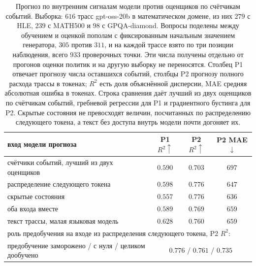 \documentclass[11pt]{article}
\begin{document}
\begin{table}[t]
\centering
\begin{tabular}{lccc}
\toprule
вход модели прогноза & P1 $R^2\uparrow$ & P2 $R^2\uparrow$ & P2 MAE$\downarrow$ \\
\midrule
счётчики событий, лучший из двух оценщиков & $0.590$ & $0.703$ & $697$ \\
распределение следующего токена & $0.598$ & $\mathbf{0.776}$ & $647$ \\
скрытые состояния               & $0.557$ & $\mathbf{0.776}$ & $636$ \\
оба входа вместе                & $0.589$ & $0.769$ & $659$ \\
текст трассы, малая языковая модель & $0.628$ & $0.760$ & $659$ \\
\midrule
\multicolumn{4}{l}{роль предобучения на входе из распределения следующего токена, P2 $R^2$:}\\
предобучение заморожено / с нуля / целиком дообучено & \multicolumn{3}{c}{$0.776$ / $0.761$ / $0.735$}\\
\bottomrule
\end{tabular}
\caption{Прогноз по внутренним сигналам модели против оценщиков по счётчикам событий. Выборка: $616$ трасс gpt-oss-20b в математическом домене, из них $279$ с HLE, $239$ с MATH500 и $98$ с GPQA-diamond. Вопросы поделены между обучением и оценкой пополам с фиксированным начальным значением генератора, $305$ против $311$, и на каждой трассе взято по три позиции наблюдения, всего $933$ проверочных точки. Эти числа получены отдельно от прогонов оценки политик и на другую выборку не переносятся. Столбец P1 отвечает прогнозу числа оставшихся событий, столбцы P2 прогнозу полного расхода трассы в токенах; $R^2$ есть доля объяснённой дисперсии, MAE средняя абсолютная ошибка в токенах. Строка сравнения даёт лучший из двух оценщиков по счётчикам событий, гребневой регрессии для P1 и градиентного бустинга для P2. Скрытые состояния не превосходят величин, посчитанных по распределению следующего токена, а текст без доступа внутрь модели почти догоняет их.}
\label{tab:monitor}
\end{table}
\end{document}
